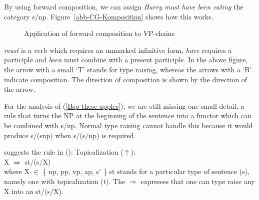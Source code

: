 By using forward composition, we can assign \emph{Harry must have been eating} the category
s/np. Figure~\vref{abb-CG-Komposition} shows how this works.
\begin{figure}
\centerline{%
}
\caption{\label{abb-CG-Komposition}Application of forward composition to VP-chains}
\end{figure}%
\emph{must} is a verb which requires an unmarked infinitive form,  \emph{have} requires a participle and \emph{been} must combine with a
present participle. In the above figure, the arrow with a small `T' stands for type raising, whereas the arrows with a `B' indicate composition.
The direction of composition is shown by the direction of the arrow.

For the analysis of (\ref{Bsp-these-apples}), we are still missing one small detail, a rule that turns the NP at the beginning of the sentence
into a functor which can be combined with s/np. Normal type raising cannot handle this because it would produce s/(s\bs np) when s/(s/np)
is required.

\citet[]{Steedman89a} suggests the rule in ():
\ea
\label{Regel-Topikalisierung}
Topicalization ($\uparrow$\is{$\uparrow$}):\\
X $\Rightarrow$ st/(s/X)\\
where X $\in$ \{ np, pp, vp, ap, s$'$ \}
\z
st stands for a particular type of sentence (s), namely one with topicalization (t). The
$\Rightarrow$ expresses that one can type raise any X into an st/(s/X). 

